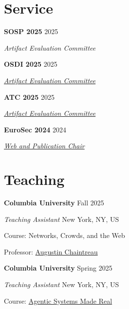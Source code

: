 \documentclass[margin,12pt]{resume}
\newcommand{\subsectionVSpace}{\vspace{3.5ex}\xspace}
\newcommand{\sectionVSpace}{\vspace{1ex}\xspace} %
\newcommand{\sectionVSpaceCorrection}{\vspace{-3.5ex}} %
\newcommand{\header}[1]{\textbf{#1}\xspace}
\newcommand{\institution}[1]{\header{#1}\xspace}
\newcommand{\place}[1]{#1\xspace}
\newcommand{\role}[1]{\textit{#1}\xspace}
\newcommand{\service}[1]{\header{#1}\xspace}
\newcommand{\singleDate}[1]{#1\xspace}
\newcommand{\stitle}[1]{#1:\xspace}
\newenvironment{rSubsection}{}{\par\subsectionVSpace}
\newenvironment{rSection}[1]{\sectionVSpaceCorrection\section{#1}\xspace}{\sectionVSpace\par}
\begin{document}
\begin{resume}
\begin{rSection}{Service}
        \begin{rSubsection}
            \service{SOSP 2025} \hfill 2025

            \role{Artifact Evaluation Committee}
        \end{rSubsection}

        \begin{rSubsection}
            \service{OSDI 2025} \hfill 2025

            \role{\href{https://www.usenix.org/conference/atc25}{Artifact Evaluation Committee}}
        \end{rSubsection}

        \begin{rSubsection}
            \service{ATC 2025} \hfill 2025

            \role{\href{https://www.usenix.org/conference/osdi25}{Artifact Evaluation Committee}}
        \end{rSubsection}

        \begin{rSubsection}
            \service{EuroSec 2024} \hfill 2024

            \role{\href{https://secopera.eu/eurosec-2024/}{Web and Publication Chair}}
        \end{rSubsection}
    \end{rSection}

    \begin{rSection}{Teaching}
        \begin{rSubsection}
            \institution{Columbia University} \hfill \singleDate{Fall 2025}

            \role{Teaching Assistant} \hfill \place{New York, NY, US}

            \stitle{Course} Networks, Crowds, and the Web %

            \stitle{Professor} \href{https://www.engineering.columbia.edu/faculty-staff/directory/augustin-chaintreau}{Augustin Chaintreau}
        \end{rSubsection}

        \begin{rSubsection}
            \institution{Columbia University} \hfill \singleDate{Spring 2025}

            \role{Teaching Assistant} \hfill \place{New York, NY, US}

            \stitle{Course} \href{https://w6113.github.io/}{Agentic Systems Made Real}


\end{rSubsection}
\end{rSection}
\end{resume}
\end{document}
